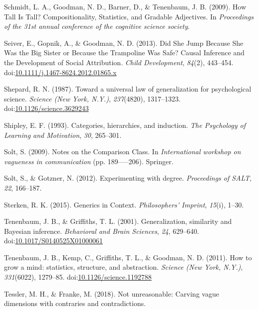 \documentclass[english,,man,floatsintext]{apa6}
\theoremstyle{definition}
\theoremstyle{definition}
\theoremstyle{definition}
\theoremstyle{remark}
\begin{document}
\leavevmode\hypertarget{ref-Schmidt2009}{}%
Schmidt, L. A., Goodman, N. D., Barner, D., \& Tenenbaum, J. B. (2009).
How Tall Is Tall? Compositionality, Statistics, and Gradable Adjectives.
In \emph{Proceedings of the 31st annual conference of the cognitive
science society}.

\leavevmode\hypertarget{ref-Seiver2013}{}%
Seiver, E., Gopnik, A., \& Goodman, N. D. (2013). Did She Jump Because
She Was the Big Sister or Because the Trampoline Was Safe? Causal
Inference and the Development of Social Attribution. \emph{Child
Development}, \emph{84}(2), 443--454.
doi:\href{https://doi.org/10.1111/j.1467-8624.2012.01865.x}{10.1111/j.1467-8624.2012.01865.x}

\leavevmode\hypertarget{ref-Shepard1987}{}%
Shepard, R. N. (1987). Toward a universal law of generalization for
psychological science. \emph{Science (New York, N.Y.)},
\emph{237}(4820), 1317--1323.
doi:\href{https://doi.org/10.1126/science.3629243}{10.1126/science.3629243}

\leavevmode\hypertarget{ref-Shipley1993}{}%
Shipley, E. F. (1993). Categories, hierarchies, and induction. \emph{The
Psychology of Learning and Motivation}, \emph{30}, 265--301.

\leavevmode\hypertarget{ref-Solt2009}{}%
Solt, S. (2009). Notes on the Comparison Class. In \emph{International
workshop on vagueness in communication} (pp. 189-----206). Springer.

\leavevmode\hypertarget{ref-Solt2012}{}%
Solt, S., \& Gotzner, N. (2012). Experimenting with degree.
\emph{Proceedings of SALT}, \emph{22}, 166--187.

\leavevmode\hypertarget{ref-Sterken2015}{}%
Sterken, R. K. (2015). Generics in Context. \emph{Philosophers'
Imprint}, \emph{15}(i), 1--30.

\leavevmode\hypertarget{ref-Tenenbaum2001}{}%
Tenenbaum, J. B., \& Griffiths, T. L. (2001). Generalization, similarity
and Bayesian inference. \emph{Behavioral and Brain Sciences}, \emph{24},
629--640.
doi:\href{https://doi.org/10.1017/S0140525X01000061}{10.1017/S0140525X01000061}

\leavevmode\hypertarget{ref-Tenenbaum2011}{}%
Tenenbaum, J. B., Kemp, C., Griffiths, T. L., \& Goodman, N. D. (2011).
How to grow a mind: statistics, structure, and abstraction.
\emph{Science (New York, N.Y.)}, \emph{331}(6022), 1279--85.
doi:\href{https://doi.org/10.1126/science.1192788}{10.1126/science.1192788}

\leavevmode\hypertarget{ref-Tessler2018negant}{}%
Tessler, M. H., \& Franke, M. (2018). Not unreasonable: Carving vague
dimensions with contraries and contradictions.
\end{document}
